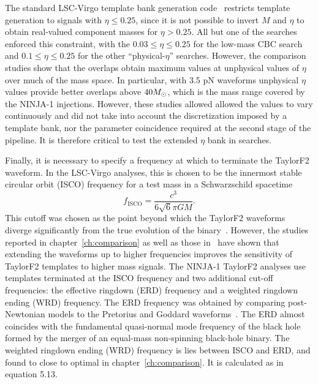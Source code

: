 The standard LSC-Virgo template bank generation
code~\cite{Babak:2006ty} restricts template generation to signals with
$\eta \le 0.25$, since it is not possible to invert $M$ and $\eta$ to
obtain real-valued component masses for $\eta > 0.25$.  All but one of
the searches enforced this constraint, with the $0.03 \le \eta \le
0.25$ for the low-mass CBC search and $0.1 \le \eta \le 0.25$ for the
other ``physical-$\eta$'' searches.  However, the comparison studies
show that the overlaps obtain maximum values at unphysical values of
$\eta$ over much of the mass space.  In particular, with 3.5 pN
waveforms unphysical $\eta$ values provide better overlaps above
$40 M_\odot$, which is the mass range covered by the NINJA-1 injections.
However, these studies allowed allowed the values to vary continuously
and did not take into account the discretization imposed by a template
bank, nor the parameter coincidence required at the second stage of
the pipeline.  It is therefore critical to test the extended $\eta$
bank in searches.

Finally, it is necessary to specify a frequency at which to
terminate the TaylorF2 waveform. In the LSC-Virgo analyses, this is
chosen to be the innermost stable circular orbit (ISCO) frequency for
a test mass in a Schwarzschild spacetime 
%
\begin{equation} \label{f_ISCO} f_\mathrm{ISCO} =
\frac{c^3}{6\sqrt{6}\pi GM}.  \end{equation}
%
This cutoff was chosen as the point beyond which the TaylorF2
waveforms diverge significantly from the true evolution of the
binary~\cite{Blanchet:2002av}.  However, the studies reported in
chapter~\ref{ch:comparison} as well as those in~\cite{Pan:2007nw} have
shown that extending the waveforms up to higher frequencies improves
the sensitivity of TaylorF2 templates to higher mass signals.  The
NINJA-1 TaylorF2 analyses use templates terminated at the ISCO
frequency and two additional cut-off frequencies: the effective
ringdown (ERD) frequency and a weighted ringdown ending (WRD)
frequency. The ERD frequency was obtained by comparing post-Newtonian
models to the Pretorius and Goddard waveforms~\cite{Pan:2007nw}. The
ERD almost coincides with the fundamental quasi-normal mode frequency
of the black hole formed by the merger of an equal-mass non-spinning
black-hole binary. The weighted ringdown ending (WRD) frequency is
lies between ISCO and ERD, and found to close to optimal in
chapter~\ref{ch:comparison}.  It is calculated as in equation 5.13.


